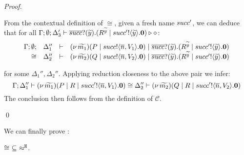 \begin{proof}
\begin{enumerate}[I.]
\begin{enumerate}[i)]
							From the contextual definition of $\cong$,
							given a fresh name $succ'$, 
							 we can deduce that  for all $\Gamma; \emptyset; \Delta_3' \vdash \overline{succ} ? (\widetilde{y}) . (R^{\widetilde{y}} \;|\; succ' ! \langle \widetilde{y} \rangle . \mathbf{0}) \triangleright \diamond$:
							\[
								\begin{array}{rcll} \Gamma; \emptyset; &\Delta_1''& \vdash& (\nu\, \widetilde{m_1})(P \;|\; succ ! \langle \overline{n}, V_1 \rangle . \mathbf{0})
									\;|\; \overline{succ} ? (\widetilde{y}) . (R^{\widetilde{y}} \;|\; succ' ! \langle \widetilde{y} \rangle . \mathbf{0})\\ \cong &\Delta_2''& \vdash &  (\nu\, \widetilde{m_2})(Q \;|\; succ ! \langle \overline{n}, V_2 \rangle . \mathbf{0})
									\;|\; \overline{succ} ? (\widetilde{y}) . (R^{\widetilde{y}} \;|\; succ' ! \langle \widetilde{y} \rangle . \mathbf{0}) \end{array}
							\]

							for some   $\Delta_1'', \Delta_2''$. Applying reduction closeness to the above pair we infer:
							\[
								\Gamma; \Delta_1'' \vdash (\nu\, \widetilde{m_1})(P \;|\; R \;|\; succ' ! \langle \overline{n}, V_1 \rangle . \mathbf{0}) \cong \Delta_2'' \vdash (\nu\, \widetilde{m_2})(Q \;|\; R \;|\; succ' ! \langle \overline{n}, V_2 \rangle . \mathbf{0})
							\]
						\noi The conclusion then follows from the definition of $\mathcal{C}$.
	    \end{enumerate}
	\end{enumerate}
	\qed
\end{proof}

We can finally prove :

\begin{lemma}\rm
	\label{app:lem:cong_is_wb}
	$\cong\ \subseteq\ \approx^\mathtt{H}$.
\end{lemma}

